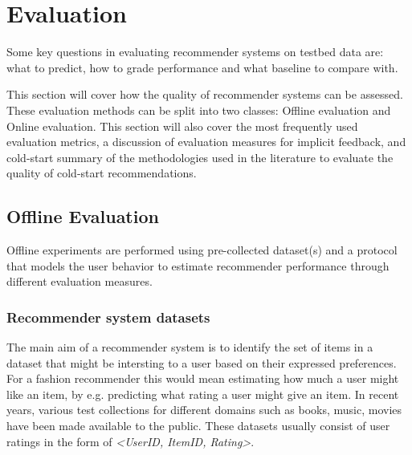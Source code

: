 
\section{Evaluation}




Some key questions in evaluating recommender systems on testbed data are: what
to predict, how to grade performance and what baseline to compare with.


This section will cover how the quality of recommender systems can be
assessed. These evaluation methods can be split into two classes: Offline
evaluation and Online evaluation. This section will also cover the most
frequently used evaluation metrics, a discussion of evaluation measures for implicit feedback, and cold-start summary of the methodologies used in the literature to evaluate the quality of cold-start recommendations.


\subsection{Offline Evaluation}

Offline experiments are performed using pre-collected dataset(s) and a protocol that models the user behavior to estimate recommender performance through different evaluation measures.

\subsubsection{Recommender system datasets}

The main aim of a recommender system is to identify the set of items in a dataset that might be intersting to a user based on their expressed preferences. For a fashion recommender this would mean estimating how much a user might like an item, by e.g. predicting what rating a user might give an item. In recent years, various test collections for different domains such as books, music, movies have been made available to the public. These datasets usually consist of user ratings in the form of \emph{<UserID, ItemID, Rating>}.

